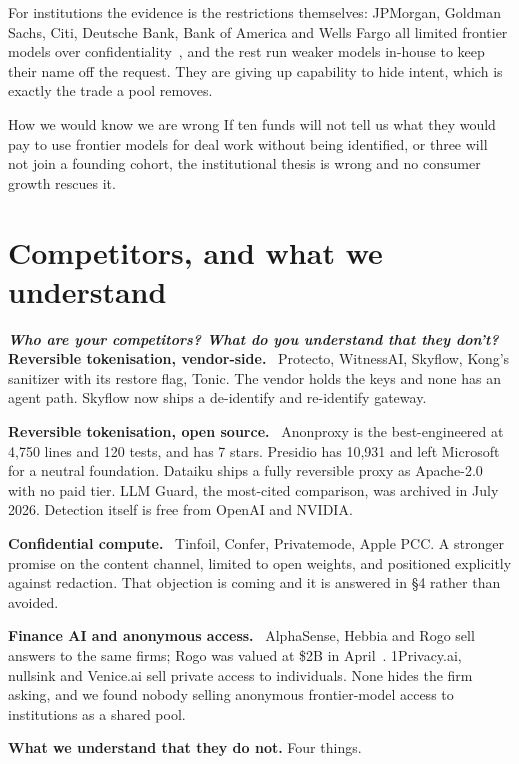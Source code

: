 \documentclass[9pt,twocolumn,a4paper]{extarticle}
\newcommand{\para}[1]{\vspace{3pt}\textbf{#1}\ }
\newcommand{\q}[1]{{\fontsize{7}{9}\selectfont\bfseries\itshape\color{indigo!80!black}#1}\\[2pt]}
\begin{document}
For institutions the evidence is the restrictions themselves: JPMorgan, Goldman Sachs, Citi, Deutsche Bank, Bank of America and Wells Fargo all limited frontier models over confidentiality~\cite{bans}, and the rest run weaker models in-house to keep their name off the request. They are giving up capability to hide intent, which is exactly the trade a pool removes.

\begin{callout}{How we would know we are wrong}
If ten funds will not tell us what they would pay to use frontier models for deal work without being identified, or three will not join a founding cohort, the institutional thesis is wrong and no consumer growth rescues it.
\end{callout}

\section{Competitors, and what we understand}
\q{Who are your competitors? What do you understand that they don't?}

\para{Reversible tokenisation, vendor-side.} Protecto, WitnessAI, Skyflow, Kong's sanitizer with its restore flag, Tonic. The vendor holds the keys and none has an agent path. Skyflow now ships a de-identify and re-identify gateway.

\para{Reversible tokenisation, open source.} Anonproxy is the best-engineered at 4{,}750 lines and 120 tests, and has 7 stars. Presidio has 10{,}931 and left Microsoft for a neutral foundation. Dataiku ships a fully reversible proxy as Apache-2.0 with no paid tier. LLM Guard, the most-cited comparison, was archived in July 2026. Detection itself is free from OpenAI and NVIDIA.

\para{Confidential compute.} Tinfoil, Confer, Privatemode, Apple PCC. A stronger promise on the content channel, limited to open weights, and positioned explicitly against redaction. That objection is coming and it is answered in \S4 rather than avoided.

\para{Finance AI and anonymous access.} AlphaSense, Hebbia and Rogo sell answers to the same firms; Rogo was valued at \$2B in April~\cite{finai}. 1Privacy.ai, nullsink and Venice.ai sell private access to individuals. None hides the firm asking, and we found nobody selling anonymous frontier-model access to institutions as a shared pool.

\vspace{3pt}
\textbf{What we understand that they do not.} Four things.
\end{document}
